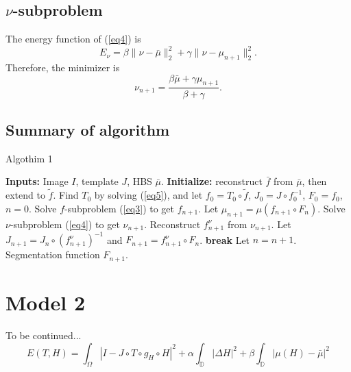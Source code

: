 \documentclass{article}
\begin{document}
\subsection{$\nu$-subproblem}
The energy function of (\ref{eq4}) is
\begin{equation}
    E_\nu = \beta \| \nu - \bar{\mu} \|^2_2 + \gamma \| \nu - \mu_{n+1} \|^2_2.
\end{equation}
Therefore, the minimizer is
\begin{equation}
    \nu_{n+1} = \frac{\beta \bar{\mu} + \gamma \mu_{n+1}}{\beta + \gamma}.
\end{equation}

\subsection{Summary of algorithm}

\begin{algorithm}[H]                           %
        \caption{Algothim 1}          %
        \label{alg1}      %
        \begin{algorithmic}  %
            \STATE \textbf{Inputs:} Image $I$, template $J$, HBS $\bar{\mu}$.
            \STATE \textbf{Initialize:} reconstruct $\bar{f}$ from $\bar{\mu}$, then extend to $\tilde{f}$.
            \STATE Find $T_0$ by solving (\ref{eq5}), and let $f_0 = T_0 \circ \tilde{f}$, $J_0 = J \circ f_0^{-1}$, $F_0 = f_0$, $n=0$.
                \STATE Solve $f$-subproblem (\ref{eq3}) to get $f_{n+1}$.
                \STATE Let $\mu_{n+1} = \mu(f_{n+1} \circ F_n)$.
                \STATE Solve $\nu$-subproblem (\ref{eq4}) to get $\nu_{n+1}$.
                \STATE Reconstruct $f^{\nu}_{n+1}$ from $\nu_{n+1}$.
                \STATE Let $J_{n+1} = J_n \circ (f^{\nu}_{n+1})^{-1}$ and $F_{n+1} = f^{\nu}_{n+1} \circ F_n$.
                    \STATE \textbf{break}
                \ENDIF
                \STATE Let $n = n+1$.
            \ENDWHILE
            \RETURN Segmentation function $F_{n+1}$.
        \end{algorithmic}
        \end{algorithm}

\section{Model 2}
To be continued...
\begin{equation}
    E(T, H) = \int_\Omega | I - J \circ T \circ g_H \circ H |^2 + \alpha \int_\mathbb{D} | \Delta H |^2 + \beta \int_\mathbb{D} | \mu(H) - \bar{\mu} |^2
\end{equation}
\end{document}
